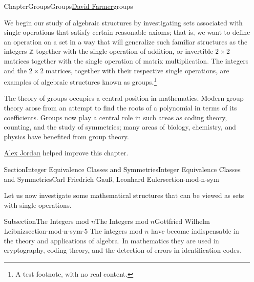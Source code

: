 \documentclass[oneside,10pt,]{book}
\numberwithin{equation}{section}
\begin{document}
\begin{chapterptx}{Chapter}{Groups}{}{Groups}{\hyperlink{dfarmer}{David Farmer}}{}{groups}
\renewcommand*{\chaptername}{Chapter}
\begin{introduction}{}%
We begin our study of algebraic structures by investigating sets associated with single operations that satisfy certain reasonable axioms; that is, we want to define an operation on a set in a way that will generalize such familiar structures as the integers \({\mathbb Z}\) together with the single operation of  addition, or invertible \(2 \times 2\) matrices together with the single operation of matrix multiplication.  The integers and the \(2 \times 2\) matrices, together with their respective single operations, are examples of algebraic structures known as groups.\footnote{A test footnote, with no real content.\label{groups-3-1-4}}%
\par
The theory of groups occupies a central position in mathematics.  Modern group theory arose from an attempt to find the roots of a polynomial in terms of its coefficients.  Groups now play a central role in such areas as coding theory, counting, and the study of  symmetries; many areas of biology, chemistry, and physics have benefited from group theory.%
\par
\hyperlink{ajordan}{Alex Jordan} helped improve this chapter.%
\end{introduction}%
%
%
\typeout{************************************************}
\typeout{************************************************}
%
\begin{sectionptx}{Section}{Integer Equivalence Classes and Symmetries}{}{Integer Equivalence Classes and Symmetries}{Carl Friedrich Gauß, Leonhard Euler}{}{section-mod-n-sym}
\begin{introduction}{}%
Let us now investigate some mathematical structures that can be viewed as sets with single operations.%
\end{introduction}%
%
%
\typeout{************************************************}
\typeout{************************************************}
%
\begin{subsectionptx}{Subsection}{The Integers mod \(n\)}{}{The Integers mod \(n\)}{Gottfried Wilhelm Leibniz}{}{section-mod-n-sym-5}
The integers mod \(n\) have become indispensable in the theory and applications of algebra.  In mathematics they are used in cryptography, coding theory, and the detection of errors in identification codes.%

\end{subsectionptx}
\end{sectionptx}
\end{chapterptx}
\end{document}
